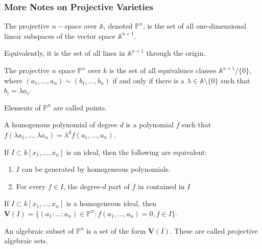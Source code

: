 \documentclass[crop=false,class=article,oneside]{standalone}
\begin{document}
    \subsubsection{More Notes on Projective Varieties}
    \begin{definition}
    The projective $n-$space over $\mathbb{A}$, denoted $\mathbb{P}^n$, is the set of all one-dimensional linear subspaces of the vector space $\mathbb{A}^{n+1}$.
    \end{definition}
    \begin{remark}
    Equivalently, it is the set of all lines in $\mathbb{A}^{n+1}$ through the origin.
    \end{remark}
    \begin{definition}
    The projective $n$ space $\mathbb{P}^{n}$ over $k$ is the set of all equivalence classes $\mathbb{A}^{n+1}/\{0\}$, where $(a_1,\hdots, a_n)\sim (b_1,\hdots, b_n)$ if and only if there is a $\lambda\in\mathbb{A}\setminus\{0\}$ such that $b_{i}=\lambda a_{i}$.
    \end{definition}
    \begin{remark}
    Elements of $\mathbb{P}^{n}$ are called points.
    \end{remark}
    \begin{definition}
    A homogenous polynomial of degree $d$ is a polynomial $f$ such that $f(\lambda a_1,\hdots, \lambda a_n) = \lambda^d f(a_1,\hdots, a_n)$.
    \end{definition}
    \begin{theorem}
    If $I\subset k[x_1,\hdots ,x_n]$ is an ideal, then the following are equivalent:
    \begin{enumerate}
        \item $I$ can be generated by homogeneous polynomials.
        \item For every $f\in I$, the degree-$d$ part of $f$ in contained in $I$
    \end{enumerate}
    \end{theorem}
    \begin{definition}
    If $I\subset k[x_1,\hdots ,x_n]$ is a homogeneous ideal, then $\mathbf{V}(I)=\{(a_1:\hdots:a_{n})\in\mathbb{P}^{n}:f(a_{1},\hdots,a_{n})=0,f\in I\}$.
    \end{definition}
    \begin{definition}
    An algebraic subset of $\mathbb{P}^{n}$ is a set of the form $\mathbf{V}(I)$. These are called projective algebraic sets.
    \end{definition}
\end{document}
